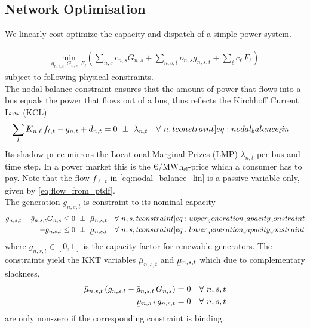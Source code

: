 \documentclass[11pt,twocolumn]{article}
\newcommand{\ubar}[1]{\underaccent{\bar}{#1}}
\newcommand{\generation}[1][n]{g_{#1,s,t}}
\newcommand{\generationpotential}{\bar{g}_{n,s,t}}
\newcommand{\nodalgeneration}[1][n]{g_{#1,t}}
\newcommand{\capacityGeneration}{G_{n,s}}
\newcommand{\capacityFlow}{F_{\ell}}
\newcommand{\capexGeneration}{c_{n,s}}
\newcommand{\capexFlow}{c_{\ell}}
\newcommand{\opexGeneration}[1][n]{o_{#1,s}}
\newcommand{\nodaldemand}[1][n]{d_{#1,t}}
\newcommand{\incidence}[1][n]{K_{#1,\ell}}
\newcommand{\mulowergeneration}[1][n]{\ubar{\mu}_{#1,s,t}}
\newcommand{\muuppergeneration}[1][n]{\bar{\mu}_{#1,s,t}}
\newcommand{\lmp}[1][n]{\lambda_{#1,t}}
\newcommand{\flow}{f_{\ell,t}}
\newcommand{\megawatthour}{MWh$_\text{el}$}
\newcommand{\resultsin}[1]{\hspace{6pt} \bot  \hspace{6pt} #1}
\newcommand{\Forall}[1]{\hspace{10pt} \forall \,\, #1 }
\begin{document}
\subsection{Network Optimisation}

% 
% 

We linearly cost-optimize the capacity and dispatch of a simple power system. 

\begin{align}
    \underset{\generation, \capacityGeneration, \capacityFlow}{\text{min}}
    \left(\sum_{n,s} \capexGeneration \capacityGeneration + \sum_{n, s, t} \opexGeneration \generation + \sum_{\ell} \capexFlow \, \capacityFlow \right) \label{eq:minisation}
\end{align}
subject to following physical constraints. 
\\

The nodal balance constraint ensures that the amount of power that flows into a bus equals the power that flows out of a bus, thus reflects the Kirchhoff Current Law (KCL)
\begin{align}
    \sum_l \incidence \, \flow  - \nodalgeneration + \nodaldemand &= 0 \resultsin{\lmp} \Forall{n,t}
    \label[constraint]{eq:nodal_balance_lin}
\end{align}
Its shadow price mirrors the Locational Marginal Prizes (LMP) $\lmp$ per bus and time step. In a power market this is the \euro/\megawatthour-price which a consumer has to pay. Note that the flow $\flow$ in \cref{eq:nodal_balance_lin} is a passive variable only, given by \cref{eq:flow_from_ptdf}.\\

The generation $\generation$ is constraint to its nominal capacity
\begin{align}
 \generation - \generationpotential \capacityGeneration  &\le 0 \resultsin{\muuppergeneration} \Forall{n,s,t} 
 \label[constraint]{eq:upper_generation_capacity_constraint}\\ 
 - \generation &\le 0 \resultsin{\mulowergeneration} \Forall{n,s,t} 
 \label[constraint]{eq:lower_generation_capacity_constraint}
 \end{align}
where $\generationpotential \in \left[ 0,1\right]$ is the capacity factor for renewable generators. The constraints yield the KKT variables $\muuppergeneration$ and $\mulowergeneration$ which due to complementary slackness,
\begin{align}
\muuppergeneration \left( \generation - \generationpotential \, \capacityGeneration \right)  &= 0  \Forall{n,s,t} 
\label{eq:complementary_slackness_upper_generation} \\
\mulowergeneration  \, \generation &= 0 \Forall{n,s,t}
\label{eq:complementary_slackness_lower_generation} 
\end{align}
are only non-zero if the corresponding constraint is binding. \\
\end{document}
